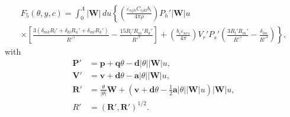 \documentclass[12pt]{article}
\begin{document}
\begin{multline}
F_5(\theta,y,c) = \int_0^{\Lambda}|\mathbf{W}|\,du\left\{\left(\frac{\varepsilon_{njh}C_{ijkl}b_i}{4\pi\rho}\right)P_h'|\mathbf{W}|u \right. \\
\left. \times \left[\frac{3(\delta_{mk}R_l' + \delta_{kl}R_n' + \delta_{ml}R_k')}{R'^5} - \frac{15R_l'R_m'R_k'}{R'^7}\right] + \left(\frac{b_i\varepsilon_{nrs}}{4\pi}\right)V_r'P_s'\left(\frac{3R_l'R_m'}{R'^5} - \frac{\delta_{lm}}{R'^3}\right)\right\},
\end{multline}
with
\begin{align*}
\mathbf{P}' &= \mathbf{p} + \mathbf{q}\theta - \mathbf{d}|\theta||\mathbf{W}|u, \\
\mathbf{V}' &= \mathbf{v} + \mathbf{d}\theta - \mathbf{a}|\theta||\mathbf{W}|u, \\
\mathbf{R}' &= \frac{\theta}{|\theta|}\mathbf{W} + (\mathbf{v}+\mathbf{d}\theta - \tfrac{1}{2}\mathbf{a}|\theta||\mathbf{W}|u)|\mathbf{W}|u, \\
R' &= (\mathbf{R}',\mathbf{R}')^{1/2}.
\end{align*}
\end{document}
